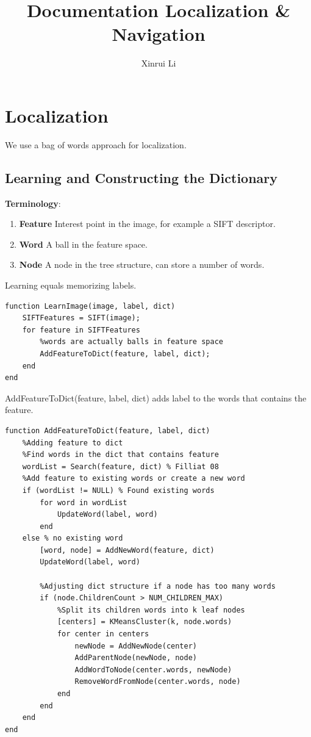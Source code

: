 \documentclass[a4paper]{scrartcl}
\begin{document}
\title{Documentation Localization \& Navigation}
\author{Xinrui Li}
\maketitle
\section{Localization}
We use a bag of words approach for localization.
\subsection{Learning and Constructing the Dictionary}

\textbf{Terminology}:
\begin{enumerate}
\item \textbf{Feature} Interest point in the image, for example a SIFT descriptor.
\item \textbf{Word} A ball in the feature space.
\item \textbf{Node} A node in the tree structure, can store a number of words.
\end{enumerate}

\begin{listing}[H]
\caption{Learning equals memorizing labels.}
\begin{verbatim}
function LearnImage(image, label, dict)
	SIFTFeatures = SIFT(image);
    for feature in SIFTFeatures
    	%words are actually balls in feature space
		AddFeatureToDict(feature, label, dict);
    end
end
\end{verbatim}
\end{listing}

\begin{listing}[H]
\caption{AddFeatureToDict(feature, label, dict) adds label to the words that contains the feature.}
\begin{verbatim}
function AddFeatureToDict(feature, label, dict)
	%Adding feature to dict
	%Find words in the dict that contains feature
	wordList = Search(feature, dict) % Filliat 08
    %Add feature to existing words or create a new word
    if (wordList != NULL) % Found existing words
    	for word in wordList
        	UpdateWord(label, word) 
		end
    else % no existing word
    	[word, node] = AddNewWord(feature, dict) 
        UpdateWord(label, word)
        
        %Adjusting dict structure if a node has too many words
        if (node.ChildrenCount > NUM_CHILDREN_MAX)
            %Split its children words into k leaf nodes
            [centers] = KMeansCluster(k, node.words)
			for center in centers
            	newNode = AddNewNode(center)
                AddParentNode(newNode, node)
            	AddWordToNode(center.words, newNode)
                RemoveWordFromNode(center.words, node)
    		end
        end
    end
end
\end{verbatim}
\end{listing}
\end{document}
